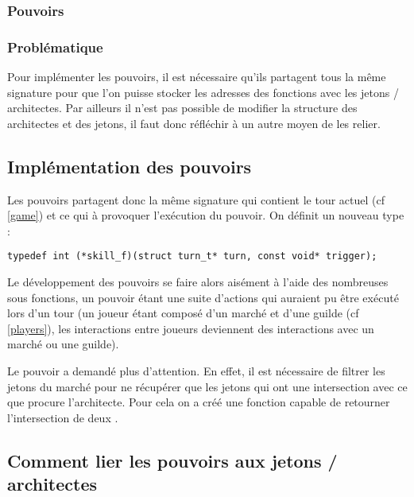 \subsubsection{Pouvoirs}

\label{skills}

\subsubsection*{Problématique}

Pour implémenter les pouvoirs, il est nécessaire qu'ils partagent tous la même signature pour que l'on puisse stocker les adresses des fonctions avec les jetons / architectes. Par ailleurs il n'est pas possible de modifier la structure des architectes et des jetons, il faut donc réfléchir à un autre moyen de les relier.

\subsection*{Implémentation des pouvoirs}

Les pouvoirs partagent donc la même signature qui contient le tour actuel (cf \ref{game}) et ce qui à provoquer l'exécution du pouvoir. On définit un nouveau type :

\begin{lstlisting}[frame=single, caption={Signature des pouvoirs}]
typedef int (*skill_f)(struct turn_t* turn, const void* trigger);
\end{lstlisting}

Le développement des pouvoirs se faire alors aisément à l'aide des nombreuses sous fonctions, un pouvoir étant une suite d'actions qui auraient pu être exécuté lors d'un tour (un joueur étant composé d'un marché et d'une guilde (cf \ref{players}), les interactions entre joueurs deviennent des interactions avec un marché ou une guilde).

Le pouvoir  a demandé plus d'attention. En effet, il est nécessaire de filtrer les jetons du marché pour ne récupérer que les jetons qui ont une intersection avec ce que procure l'architecte. Pour cela on a créé une fonction capable de retourner l'intersection de deux .

\subsection*{Comment lier les pouvoirs aux jetons / architectes}

